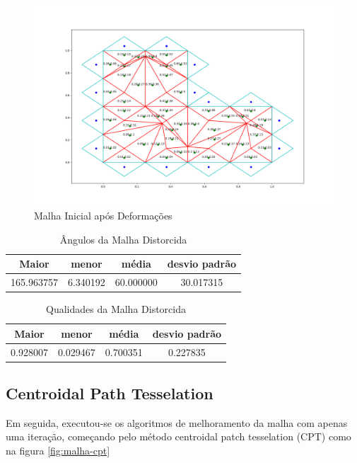 \begin{figure}[ht]
    \centering
    \includegraphics[width=1\linewidth]{fig/malha-ruim.png}
    \caption{Malha Inicial após Deformações}
    \label{fig:malha-ruim}
\end{figure}

\begin{table}[hb]
\centering
\par\caption{Ângulos da Malha Distorcida}
\begin{tabular}{c|c|c|c}
Maior&menor&média&desvio padrão\\\hline\hline
165.963757&6.340192&60.000000&30.017315\\\hline
\end{tabular}
\label{tab:angulos-malha-distorcida}
\end{table}

\begin{table}[hb]
\centering
\par\caption{Qualidades da Malha Distorcida}
\begin{tabular}{c|c|c|c}
Maior&menor&média&desvio padrão\\\hline\hline
0.928007&0.029467&0.700351&0.227835\\\hline
\end{tabular}
\label{tab:qualidades-malha-distorcida}
\end{table}

\newpage
\subsection{Centroidal Path Tesselation}

Em seguida, executou-se os algoritmos de melhoramento da malha com apenas uma iteração, começando pelo método centroidal patch tesselation (CPT) como na figura \ref{fig:malha-cpt}

